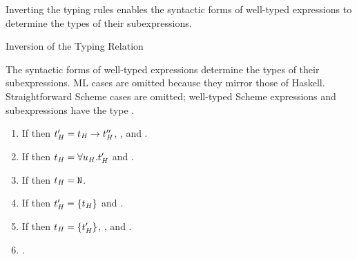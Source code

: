 Inverting the typing rules enables the syntactic forms of well-typed expressions to determine the types of their subexpressions.

\begin{lemma}{Inversion of the Typing Relation}

\label{leminv}

The syntactic forms of well-typed expressions determine the types of their subexpressions.  ML cases are omitted because they mirror those of Haskell.  Straightforward Scheme cases are omitted; well-typed Scheme expressions and subexpressions have the type \tytst.

\begin{enumerate}



\item If \judeh{\env}{\expfabss{\varvarh}{\first{\vartyh}}{\varexph}}{\second{\vartyh}} then $t_{\mathit{H}}' = t_{\mathit{H}} \rightarrow t_{\mathit{H}}''$, \judth{\env}{\first{\vartyh}}, and \judeh{\envexte{\varvarh}{\first{\vartyh}}}{\varexph}{\third{\vartyh}}.


\item If \judeh{\env}{\exptabs{\tyvarh}{\varexph}}{\first{\vartyh}} then $t_{\mathit{H}} = \forall u_{\mathit{H}} . t_{\mathit{H}}'$ and \judeh{\envextt{\tyvarh}}{\varexph}{\second{\vartyh}}.


\item If \judeh{}{\expnum{\symnum}}{\vartyh} then $t_{\mathit{H}} = \mathtt{N}$.


\item If \judeh{\env}{\expnils{\first{\vartyh}}}{\second{\vartyh}} then $t_{\mathit{H}}' = \lbrace t_{\mathit{H}} \rbrace$ and \judth{\env}{\first{\vartyh}}.


\item If \judeh{\env}{\expcons{\first{\varexph}}{\second{\varexph}}}{\first{\vartyh}} then $t_{\mathit{H}} = \lbrace t_{\mathit{H}}' \rbrace$, \judeh{\env}{\first{\varexph}}{\second{\vartyh}}, and \judeh{\env}{\second{\varexph}}{\tylist{\second{\vartyh}}}.


\item \judeh{\envexte{\varvarh}{\vartyh}}{\varvarh}{\vartyh}.


\end{enumerate}
\end{lemma}
